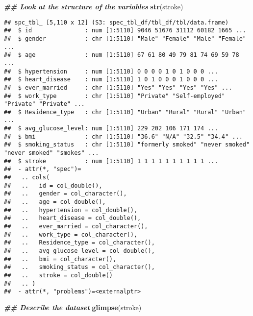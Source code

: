 \documentclass[
]{article}
\newenvironment{Shaded}{\begin{snugshade}}{\end{snugshade}}
\newcommand{\DocumentationTok}[1]{\textcolor[rgb]{0.56,0.35,0.01}{\textbf{\textit{#1}}}}
\newcommand{\FunctionTok}[1]{\textcolor[rgb]{0.13,0.29,0.53}{\textbf{#1}}}
\newcommand{\NormalTok}[1]{#1}
\begin{document}
\begin{Shaded}
\begin{Highlighting}[]
\DocumentationTok{\#\# Look at the structure of the variables }
\FunctionTok{str}\NormalTok{(stroke)}
\end{Highlighting}
\end{Shaded}

\begin{verbatim}
## spc_tbl_ [5,110 x 12] (S3: spec_tbl_df/tbl_df/tbl/data.frame)
##  $ id               : num [1:5110] 9046 51676 31112 60182 1665 ...
##  $ gender           : chr [1:5110] "Male" "Female" "Male" "Female" ...
##  $ age              : num [1:5110] 67 61 80 49 79 81 74 69 59 78 ...
##  $ hypertension     : num [1:5110] 0 0 0 0 1 0 1 0 0 0 ...
##  $ heart_disease    : num [1:5110] 1 0 1 0 0 0 1 0 0 0 ...
##  $ ever_married     : chr [1:5110] "Yes" "Yes" "Yes" "Yes" ...
##  $ work_type        : chr [1:5110] "Private" "Self-employed" "Private" "Private" ...
##  $ Residence_type   : chr [1:5110] "Urban" "Rural" "Rural" "Urban" ...
##  $ avg_glucose_level: num [1:5110] 229 202 106 171 174 ...
##  $ bmi              : chr [1:5110] "36.6" "N/A" "32.5" "34.4" ...
##  $ smoking_status   : chr [1:5110] "formerly smoked" "never smoked" "never smoked" "smokes" ...
##  $ stroke           : num [1:5110] 1 1 1 1 1 1 1 1 1 1 ...
##  - attr(*, "spec")=
##   .. cols(
##   ..   id = col_double(),
##   ..   gender = col_character(),
##   ..   age = col_double(),
##   ..   hypertension = col_double(),
##   ..   heart_disease = col_double(),
##   ..   ever_married = col_character(),
##   ..   work_type = col_character(),
##   ..   Residence_type = col_character(),
##   ..   avg_glucose_level = col_double(),
##   ..   bmi = col_character(),
##   ..   smoking_status = col_character(),
##   ..   stroke = col_double()
##   .. )
##  - attr(*, "problems")=<externalptr>
\end{verbatim}

\begin{Shaded}
\begin{Highlighting}[]
\DocumentationTok{\#\# Describe the dataset}
\FunctionTok{glimpse}\NormalTok{(stroke)}
\end{Highlighting}
\end{Shaded}
\end{document}
